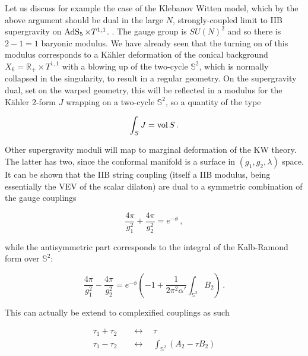 Let us discuss for example the case of the Klebanov Witten model, which by the above argument should be dual in the large $N$, strongly-coupled limit to IIB supergravity on $\operatorname{AdS}_{5} \times T^{1,1}$. . The gauge group is $SU(N)^2$ and so there is $2-1 = 1$ baryonic modulus. We have already seen that the turning on of this modulus corresponds to a K\"ahler deformation of the conical background $X_6 = \mathbb{R}_+ \times T^{1,1}$ with a blowing up of the two-cycle $\mathbb{S}^2$, which is normally collapsed in the singularity, to result in a regular geometry. On the supergravity dual, set on the warped geometry, this will be reflected in a modulus for the K\"ahler 2-form $J$ wrapping on a two-cycle $\mathbb{S}^2$, so a quantity of the type

\begin{equation}
	\int_S J = \operatorname{vol} S\,.
	\label{}
\end{equation}

Other supergravity moduli will map to marginal deformation of the KW theory. The latter has two, since the conformal manifold is a surface in $(g_1,g_2,\lambda)$ space. It can be shown\cite{erdmenger} that the IIB string coupling (itself a IIB modulus, being essentially the VEV of the scalar dilaton) are dual to a symmetric combination of the gauge couplings

\begin{equation}
	\frac{4\pi}{g_1^2} + \frac{4\pi}{g_2^2} = e^{-\phi}\,,
	\label{}
\end{equation}

while the antisymmetric part corresponds to the integral of the Kalb-Ramond form over $\mathbb{S}^2$:

\begin{equation}	
	\frac{4\pi}{g_1^2} - \frac{4\pi}{g_2^2} = e^{-\phi} \left( -1 + \frac{1}{2\pi^2 \alpha'} \int_{\mathbb{S}^2} B_2 \right)\,.
	\label{}
\end{equation}

This can actually be extend to complexified couplings as such

\begin{align}
	\tau_1 + \tau_2 \quad &\longleftrightarrow \quad \tau \\
	\tau_1 - \tau_2 \quad &\longleftrightarrow \quad \int_{\mathbb{S}^2} (A_2 -  \tau B_2)
\end{align}



